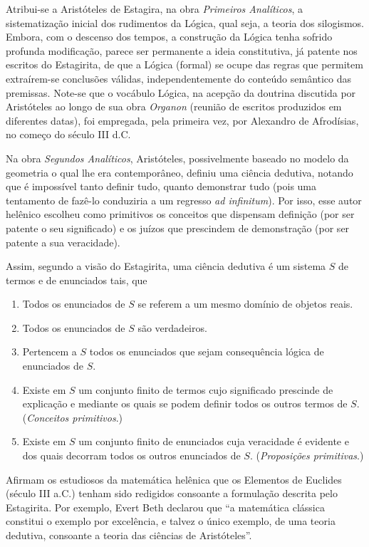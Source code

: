 \documentclass{hipatia}
\begin{document}
Atribui-se a Aristóteles de Estagira, na obra \emph{Primeiros Analíticos}, a sistematização inicial dos rudimentos da Lógica, qual seja, a teoria dos silogismos. Embora, com o descenso dos tempos, a construção da Lógica tenha sofrido profunda modificação, parece ser permanente a ideia constitutiva, já patente nos escritos do Estagirita, de que a Lógica (formal) se ocupe das regras que permitem extraírem-se conclusões válidas, independentemente do conteúdo semântico das premissas. Note-se que o vocábulo Lógica, na acepção da doutrina discutida por Aristóteles ao longo de sua obra \emph{Organon} (reunião de escritos produzidos em diferentes datas), foi empregada, pela primeira vez, por Alexandro de Afrodísias, no começo do século III d.C. 

Na obra \emph{Segundos Analíticos}, Aristóteles, possivelmente baseado no modelo da geometria o qual lhe era contemporâneo, definiu uma ciência dedutiva, notando que é impossível tanto definir tudo, quanto demonstrar tudo  (pois uma tentamento de fazê-lo conduziria a um regresso \emph{ad infinitum}). Por isso, esse autor helênico escolheu como primitivos os conceitos que dispensam definição  (por ser patente o seu significado)  e os juízos que prescindem de demonstração  (por ser patente a sua veracidade). 

Assim, segundo a visão do Estagirita, uma ciência dedutiva é um sistema $S$ de termos e de enunciados tais, que
\begin{enumerate}
    \item Todos os enunciados de $S$ se referem a um mesmo domínio de objetos reais.
    \item Todos os enunciados de $S$ são verdadeiros.   
      
\item Pertencem a $S$ todos os enunciados que sejam consequência lógica de enunciados de $S$.
\item Existe em $S$ um conjunto finito de termos cujo significado prescinde de explicação e mediante os quais se podem definir todos os outros termos de $S$. (\emph{Conceitos primitivos}.) 
\item Existe em $S$ um conjunto finito de enunciados cuja veracidade é evidente e dos quais decorram todos os outros enunciados de $S$.  (\emph{Proposições primitivas}.)   \cite{costa1994}
\end{enumerate}

Afirmam os estudiosos da matemática helênica que os Elementos de Euclides  (século III a.C.)  tenham sido redigidos consoante a formulação descrita pelo Estagirita. Por exemplo, Evert Beth declarou que ``a matemática clássica constitui o exemplo por excelência, e talvez o único exemplo, de uma teoria dedutiva, consoante a teoria das ciências de Aristóteles''. \cite{beth1955}
\end{document}
